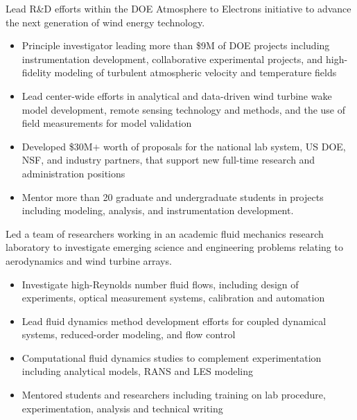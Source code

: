 \documentclass[10pt,ragged2e,a4paper,academicons]{altacv}
\begin{document}

Lead R\&D efforts within the DOE Atmosphere to Electrons initiative to advance the next generation of wind energy technology.
\begin{itemize}
\item Principle investigator leading more than \$9M of DOE projects including instrumentation development, collaborative experimental projects, and high-fidelity modeling of turbulent atmospheric velocity and temperature fields
\item Lead center-wide efforts in analytical and data-driven wind turbine wake model development, remote sensing technology and methods, and the use of field measurements for model validation
\item Developed \$30M$+$ worth of proposals for the national lab system, US DOE, NSF, and industry partners, that support new full-time research and administration positions
\item Mentor more than 20 graduate and undergraduate students in projects including modeling, analysis, and instrumentation development.
\end{itemize}

\divider

Led a team of researchers working in an academic fluid mechanics research laboratory to investigate emerging science and engineering problems relating to aerodynamics and wind turbine arrays. 
\begin{itemize}
\item Investigate high-Reynolds number fluid flows, including design of experiments, optical measurement systems, calibration and automation
\item Lead fluid dynamics method development efforts for coupled dynamical systems, reduced-order modeling, and flow control
\item Computational fluid dynamics studies to complement experimentation including analytical models, RANS and LES modeling
\item Mentored students and researchers including training on lab procedure, experimentation, analysis and technical writing
\end{itemize}

\divider
\end{document}
